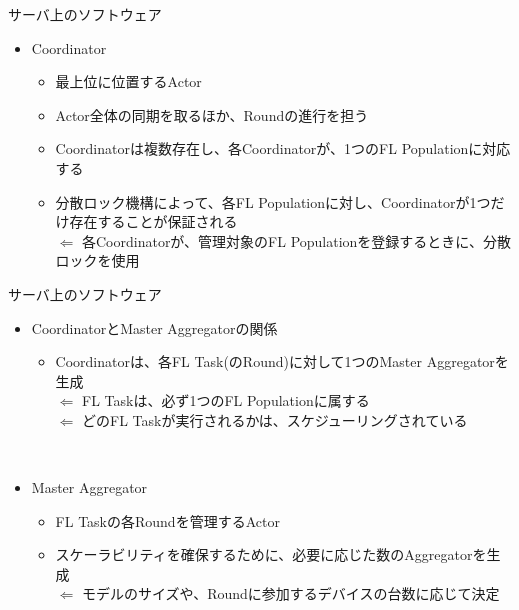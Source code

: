 \documentclass[dvipdfmx,notheorems,t]{beamer}
\begin{document}
\begin{frame}{サーバ上のソフトウェア}

\begin{itemize}
	\item \alert{Coordinator}
	\begin{itemize}
		\item 最上位に位置するActor
		\item Actor全体の同期を取るほか、Roundの進行を担う
		\newline
		
		\item Coordinatorは複数存在し、各Coordinatorが、1つのFL Populationに対応する
		\item 分散ロック機構によって、各FL Populationに対し、Coordinatorが1つだけ存在することが保証される \\
		$\Leftarrow$ 各Coordinatorが、管理対象のFL Populationを登録するときに、分散ロックを使用
	\end{itemize}
\end{itemize}

\end{frame}

\begin{frame}{サーバ上のソフトウェア}

\begin{itemize}
	\item \alert{Coordinator}と\alert{Master Aggregator}の関係
	\begin{itemize}
		\item Coordinatorは、各FL Task(のRound)に対して1つのMaster Aggregatorを生成 \\
		$\Leftarrow$ FL Taskは、必ず1つのFL Populationに属する \\
		$\Leftarrow$ どのFL Taskが実行されるかは、スケジューリングされている
	\end{itemize} \
	
	\item \alert{Master Aggregator}
	\begin{itemize}
		\item FL Taskの各Roundを管理するActor
		\item スケーラビリティを確保するために、必要に応じた数の\alert{Aggregator}を生成 \\
		$\Leftarrow$ モデルのサイズや、Roundに参加するデバイスの台数に応じて決定
	\end{itemize}
\end{itemize}

\end{frame}
\end{document}
